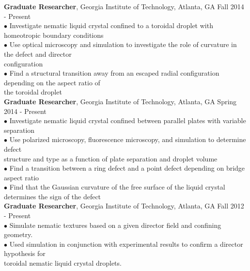 \documentclass[10pt]{article}
\begin{document}
{\bf Graduate Researcher}, Georgia Institute of Technology, Atlanta, GA \hfill Fall 2014 - Present\\
\hspace*{10pt}$\bullet$ Investigate nematic liquid crystal confined to a toroidal droplet with homeotropic boundary conditions\\
\hspace*{10pt}$\bullet$ Use optical microscopy and simulation to investigate the role of curvature in the defect and director\\ \hspace*{15pt} configuration\\
\hspace*{10pt}$\bullet$ Find a structural transition away from an escaped radial configuration depending on the aspect ratio of\\ \hspace*{15pt} the toroidal droplet\\


{\bf Graduate Researcher}, Georgia Institute of Technology, Atlanta, GA \hfill Spring 2014 - Present\\
\hspace*{10pt}$\bullet$ Investigate nematic liquid crystal confined between parallel plates with variable separation\\
\hspace*{10pt}$\bullet$ Use polarized microscopy, fluorescence microscopy, and simulation to determine defect \\ \hspace*{15pt} structure and type as a function of plate separation and droplet volume\\
\hspace*{10pt}$\bullet$ Find a transition between a ring defect and a point defect depending on bridge aspect ratio\\
\hspace*{10pt}$\bullet$ Find that the Gaussian curvature of the free surface of the liquid crystal determines the sign of the defect\\


{\bf Graduate Researcher}, Georgia Institute of Technology, Atlanta, GA \hfill Fall 2012 - Present\\
\hspace*{10pt}$\bullet$ Simulate nematic textures based on a given director field and confining geometry.\\
\hspace*{10pt}$\bullet$ Used simulation in conjunction with experimental results to confirm a director hypothesis for \\ \hspace*{15pt} toroidal nematic liquid crystal droplets.\\
\end{document}
